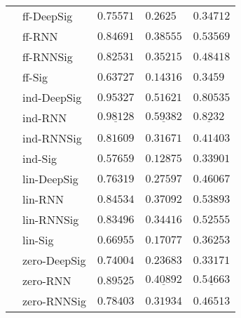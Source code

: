 \begin{tabular}{lllll}
       & ff-DeepSig &                           $ 0.75571 $ &                            $ 0.2625 $ &                          $ 0.34712 $ \\
       & ff-RNN &                           $ 0.84691 $ &                           $ 0.38555 $ &                          $ 0.53569 $ \\
       & ff-RNNSig &                           $ 0.82531 $ &                           $ 0.35215 $ &                          $ 0.48418 $ \\
       & ff-Sig &                           $ 0.63727 $ &                           $ 0.14316 $ &                           $ 0.3459 $ \\
       & ind-DeepSig &               $  \mathbf{ 0.95327 } $ &               $  \mathbf{ 0.51621 } $ &              $  \mathbf{ 0.80535 } $ \\
       & ind-RNN &  $  \mathbf{ \underline{ 0.98128 }} $ &  $  \mathbf{ \underline{ 0.59382 }} $ &  $  \mathbf{ \underline{ 0.8232 }} $ \\
       & ind-RNNSig &                           $ 0.81609 $ &                           $ 0.31671 $ &                          $ 0.41403 $ \\
       & ind-Sig &                           $ 0.57659 $ &                           $ 0.12875 $ &                          $ 0.33901 $ \\
       & lin-DeepSig &                           $ 0.76319 $ &                           $ 0.27597 $ &                          $ 0.46067 $ \\
       & lin-RNN &                           $ 0.84534 $ &                           $ 0.37092 $ &                          $ 0.53893 $ \\
       & lin-RNNSig &                           $ 0.83496 $ &                           $ 0.34416 $ &                          $ 0.52555 $ \\
       & lin-Sig &                           $ 0.66955 $ &                           $ 0.17077 $ &                          $ 0.36253 $ \\
       & zero-DeepSig &                           $ 0.74004 $ &                           $ 0.23683 $ &                          $ 0.33171 $ \\
       & zero-RNN &                           $ 0.89525 $ &            $  \underline{ 0.40892 } $ &           $  \underline{ 0.54663 } $ \\
       & zero-RNNSig &                           $ 0.78403 $ &                           $ 0.31934 $ &                          $ 0.46513 $ \\

\end{tabular}
